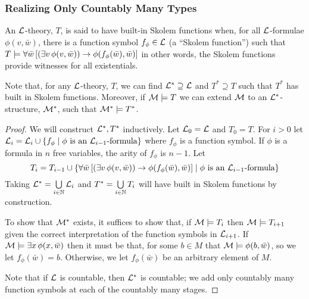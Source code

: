 \subsubsection{Realizing Only Countably Many Types}

\begin{definition}\label{definition_skolem_functions}
An \(\mathcal{L}\)-theory, \(T\), is said to have built-in Skolem functions when, for all \(\mathcal{L}\)-formulae \(\phi(v, \bar{w})\), there is a function symbol \(f_\phi \in \mathcal{L}\) (a ``Skolem function'') such that \(T \models \forall \bar{w} \left[(\exists v \, \phi(v, \bar{w})) \to \phi(f_\phi(\bar{w}), \bar{w})\right]\) in other words, the Skolem functions provide witnesses for all existentials. 
\end{definition}

\begin{theorem}\label{theorem_skolem_function_extension}
Note that, for any \(\mathcal{L}\)-theory, \(T\), we can find \(\mathcal{L}^* \supseteq \mathcal{L}\) and \(T^* \supseteq T\) such that \(T^*\) has built in Skolem functions. 
Moreover, if \(\mathcal{M} \models T\) we can extend \(\mathcal{M}\) to an \(\mathcal{L}^*\)-structure, \(\mathcal{M}^*\), such that \(\mathcal{M}^* \models T^*\). 
\end{theorem}

\begin{proof}
We will construct \(\mathcal{L}^*, T^*\) inductively. 
Let \(\mathcal{L}_0 = \mathcal{L}\) and \(T_0 = T\). 
For \(i > 0\) let \(\mathcal{L}_i = \mathcal{L}_i \cup \{f_\phi \mid \phi \text{ is an } \mathcal{L}_{i-1}\text{-formula}\}\) where \(f_\phi\) is a function symbol.
If \(\phi\) is a formula in \(n\) free variables, the arity of \(f_\phi\) is \(n-1\). 
Let \[T_i = T_{i-1} \cup \{\forall \bar{w} \left[(\exists v \, \phi(v, \bar{w})) \to \phi(f_\phi(\bar{w}), \bar{w})\right] \mid \phi \text{ is an } \mathcal{L}_{i-1}\text{-formula}\}\]
Taking \(\mathcal{L}^* = \bigcup\limits_{i \in \mathbb{N}} \mathcal{L}_i\) and \(T^* = \bigcup\limits_{i \in \mathbb{N}} T_i\) will have built in Skolem functions by construction.

To show that \(\mathcal{M}^*\) exists, it suffices to show that, if \(\mathcal{M} \models T_i\) then \(\mathcal{M} \models T_{i+1}\) given the correct interpretation of the function symbols in \(\mathcal{L}_{i+1}\).
If \(\mathcal{M} \models \exists x \, \phi(x, \bar{w})\) then it must be that, for some \(b \in M\) that \(\mathcal{M} \models \phi(b, \bar{w})\), so we let \(f_\phi(\bar{w}) = b\). 
Otherwise, we let \(f_\phi(\bar{w})\) be an arbitrary element of \(M\). 

Note that if \(\mathcal{L}\) is countable, then \(\mathcal{L}^*\) is countable; we add only countably many function symbols at each of the countably many stages.
\end{proof}

